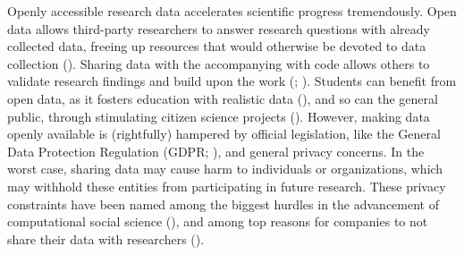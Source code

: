 \documentclass[
]{article}
\begin{document}
Openly accessible research data accelerates scientific progress
tremendously. Open data allows third-party researchers to answer
research questions with already collected data, freeing up resources
that would otherwise be devoted to data collection
(). Sharing data with the accompanying with code allows others to
validate research findings and build upon the work
(;
). Students can
benefit from open data, as it fosters education with realistic data
(),
and so can the general public, through stimulating citizen science
projects ().
However, making data openly available is (rightfully) hampered by
official legislation, like the General Data Protection Regulation (GDPR;
), and general privacy concerns. In the worst case, sharing
data may cause harm to individuals or organizations, which may withhold
these entities from participating in future research. These privacy
constraints have been named among the biggest hurdles in the advancement
of computational social science (), and among top reasons for companies to not share their data
with researchers ().
\end{document}
